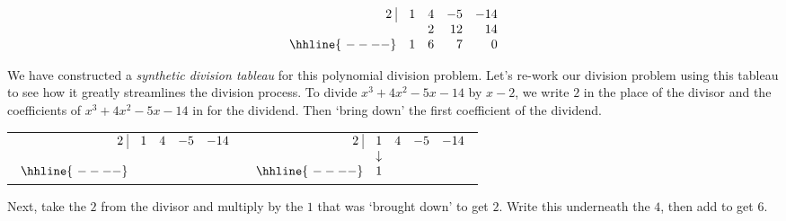 \[ \begin{array}{rrrrr}
  2 \, \, \vline& 1 & 4 & -5  & -14 \\
   &&   2 &   12 &   14 \\ \hhline{~----} 
  & 1  &   6  &  7 &  0  \\  
\end{array}\]



We have constructed a \emph{synthetic division tableau} for this polynomial division problem.  Let's re-work our division problem using this tableau to see how it greatly streamlines the division process.  To divide $x^3+4x^2-5x-14$ by $x-2$, we write $2$ in the place of the divisor and the coefficients of $x^3+4x^2-5x-14$ in for the dividend.  Then `bring down' the first coefficient of the dividend.

\bigskip

\begin{center}
\begin{tabular}{cc}
$ \begin{array}{rrrrr}
  2 \, \, \vline& 1 & 4 & -5  & -14 \\
   &  &    &    &  \\ \hhline{~----} 
  &   &     &   &    \\  
\end{array}$  \hspace{1in}
&
$ \begin{array}{rrrrr}
  2 \, \, \vline& 1 & 4 & -5  & -14 \\
   & \downarrow &    &    &  \\ \hhline{~----} 
  & 1  &     &   &    \\  
\end{array}$ \\
\end{tabular}
\end{center}

\bigskip

Next, take the $2$ from the divisor and multiply by the $1$ that was `brought down' to get $2$.  Write this underneath the $4$, then add to get $6$.

\bigskip

